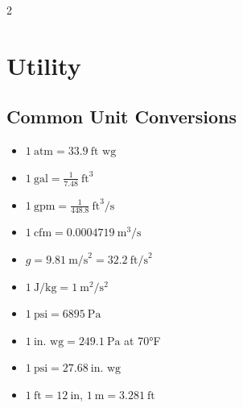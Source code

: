 \begin{multicols*}{2}
\setcounter{section}{-1} %

\section{Utility}
\subsection{Common Unit Conversions}
\begin{itemize}
    \item $1~\text{atm} = 33.9~\text{ft wg}$
    \item $1~\text{gal} = \frac{1}{7.48}~\text{ft}^3$
    \item $1~\text{gpm} = \frac{1}{448.8}~\text{ft}^3/\text{s}$
    \item $1~\text{cfm} = 0.0004719~\text{m}^3/\text{s}$
    \item $g = 9.81~\text{m/s}^2 = 32.2~\text{ft/s}^2$
    \item $1~\text{J/kg} = 1~\text{m}^2/\text{s}^2$
    \item $1~\text{psi} = 6895~\text{Pa}$
    \item $1~\text{in. wg} = 249.1~\text{Pa}$ at 70°F
    \item $1~\text{psi} = 27.68~\text{in. wg}$
    \item $1~\text{ft} = 12~\text{in}$, \quad $1~\text{m} = 3.281~\text{ft}$
\end{itemize}
\end{multicols*}